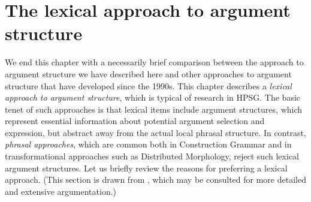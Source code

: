 \documentclass[output=paper
	        ,collection
	        ,collectionchapter
 	        ,biblatex
                ,babelshorthands
                ,newtxmath
                ,draftmode
                ,colorlinks, citecolor=brown
]{langscibook}
\begin{document}

\section{The lexical approach to argument structure}
\label{lexicalapproach}

We end this chapter with a necessarily brief comparison between the approach to argument structure we have described here and other approaches to argument structure that have developed since the 1990s.
This chapter describes a \textit{lexical approach to argument structure}, which is typical of research in HPSG.  The basic tenet of such approaches is that lexical items include argument structures, which represent essential information about potential argument selection and expression, but
abstract away from the actual local phrasal structure.  In contrast, \emph{phrasal approaches}, which
are common both in Construction Grammar  and in transformational approaches such as Distributed Morphology, reject such lexical argument structures.   Let us briefly review the reasons for preferring a lexical approach. (This section is drawn from \citealt{MWArgSt}, which may be consulted for more detailed and extensive argumentation.) 
\end{document}
